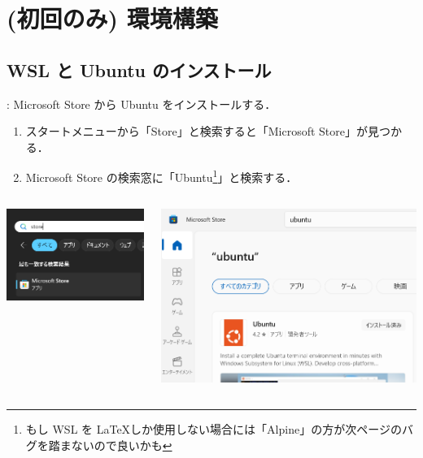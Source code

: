 \documentclass[aspectratio=169,dvipdfmx,cjk]{beamer}
\begin{document}
\section{(初回のみ) 環境構築}

\subsection{WSL と Ubuntu のインストール}
\begin{frame}{\insertsection \thesubsection: \insertsubsection}
  Microsoft Store から Ubuntu をインストールする．
  \begin{enumerate}
    \item スタートメニューから「Store」と検索すると「Microsoft Store」が見つかる．
    \item Microsoft Store の検索窓に「Ubuntu\footnote{もし WSL を \LaTeX しか使用しない場合には「Alpine」の方が次ページのバグを踏まないので良いかも}」と検索する．
  \end{enumerate}
  \begin{columns}
    \begin{column}{0.4\textwidth}
        \includegraphics[width=1.0\linewidth]{fig/store.png}
    \end{column}
    \begin{column}{0.4\textwidth}
      \includegraphics[width=1.0\linewidth]{fig/store-ubuntu.png}
    \end{column}
  \end{columns}
\end{frame}
\end{document}
